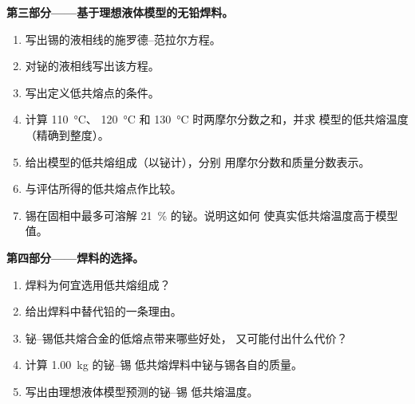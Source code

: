 \begin{problem}
\medskip
\noindent\textbf{第三部分——基于理想液体模型的无铅焊料。}
\begin{enumerate}[resume]
  \item 写出锡的液相线的施罗德–范拉尔方程。
  \item 对铋的液相线写出该方程。
  \item 写出定义低共熔点的条件。
  \item 计算 \qty{110}{\degreeCelsius}、
        \qty{120}{\degreeCelsius} 和 \qty{130}{\degreeCelsius} 时两摩尔分数之和，并求
        模型的低共熔温度（精确到整度）。
  \item 给出模型的低共熔组成（以铋计），分别
        用摩尔分数和质量分数表示。
  \item 与评估所得的低共熔点作比较。
  \item 锡在固相中最多可溶解 21~\% 的铋。说明这如何
        使真实低共熔温度高于模型值。
\end{enumerate}

\medskip
\noindent\textbf{第四部分——焊料的选择。}
\begin{enumerate}[resume]
  \item 焊料为何宜选用低共熔组成？
  \item 给出焊料中替代铅的一条理由。
  \item 铋–锡低共熔合金的低熔点带来哪些好处，
        又可能付出什么代价？
  \item 计算 \qty{1.00}{kg} 的铋–锡
        低共熔焊料中铋与锡各自的质量。
  \item 写出由理想液体模型预测的铋–锡
        低共熔温度。
\end{enumerate}
\end{problem}
